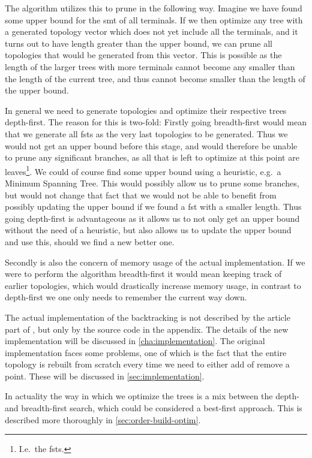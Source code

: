The algorithm utilizes this to prune in the following way. Imagine we have found
some upper bound for the \ac{smt} of all terminals. If we then optimize any tree
with a generated topology vector which does not yet include all the terminals,
and it turns out to have length greater than the upper bound, we can prune all
topologies that would be generated from this vector. This is possible as the
length of the larger trees with more terminals cannot become any smaller than
the length of the current tree, and thus cannot become smaller than the length
of the upper bound.

In general we need to generate topologies and optimize their respective trees
depth-first. The reason for this is two-fold: Firstly going breadth-first would
mean that we generate all \acp{fst} as the very last topologies to be
generated. Thus we would not get an upper bound before this stage, and would
therefore be unable to prune any significant branches, as all that is left to
optimize at this point are leaves\footnote{I.e.\ the \acp{fst}.}. We could of
course find some upper bound using a heuristic, e.g.\ a Minimum Spanning
Tree. This would possibly allow us to prune some branches, but would not change
that fact that we would not be able to benefit from possibly updating the upper
bound if we found a \ac{fst} with a smaller length. Thus going depth-first is
advantageous as it allows us to not only get an upper bound without the need of
a heuristic, but also allows us to update the upper bound and use this, should
we find a new better one.

Secondly is also the concern of memory usage of the actual implementation. If we
were to perform the algorithm breadth-first it would mean keeping track of
earlier topologies, which would drastically increase memory usage, in contrast
to depth-first we one only needs to remember the current way down.

The actual implementation of the backtracking is not described by the article
part of \textcite{smith1992}, but only by the source code in the appendix. The
details of the new implementation will be discussed in
\cref{cha:implementation}. The original implementation faces some problems,
one of which is the fact that the entire topology is rebuilt from scratch every
time we need to either add of remove a point. These will be discussed in
\cref{sec:implementation}.

In actuality the way in which we optimize the trees is a mix between the depth-
and breadth-first search, which could be considered a best-first approach. This
is described more thoroughly in \cref{sec:order-build-optim}.

